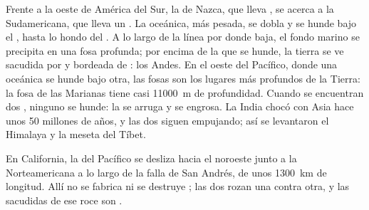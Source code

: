 \begin{example}\label{ex:g7:plate-tectonics:convergent}
Frente a la  oeste de América del Sur, la  de Nazca, que lleva
, se acerca a la  Sudamericana, que lleva un . La 
oceánica, más pesada, se dobla y se hunde bajo el , hasta lo hondo
del . A lo largo de la línea por donde baja, el fondo marino se
precipita en una fosa profunda; por encima de la  que se hunde, la
tierra se ve sacudida por  y bordeada de : los Andes. En
el oeste del Pacífico, donde una  oceánica se hunde bajo otra, las
fosas son los lugares más profundos de la Tierra: la fosa de las Marianas
tiene casi \qty{11000}{m} de profundidad. Cuando se encuentran dos
, ninguno se hunde: la  se arruga y se engrosa. La India
chocó con Asia hace unos 50 millones de años, y las dos  siguen
empujando; así se levantaron el Himalaya y la meseta del Tíbet.
\end{example}

\begin{example}\label{ex:g7:plate-tectonics:transform}
En California, la  del Pacífico se desliza hacia el noroeste junto a
la  Norteamericana a lo largo de la falla de San Andrés, de unos
\qty{1300}{km} de longitud. Allí no se fabrica ni se destruye ; las
dos  rozan una contra otra, y las sacudidas de ese roce son
.
\end{example}

